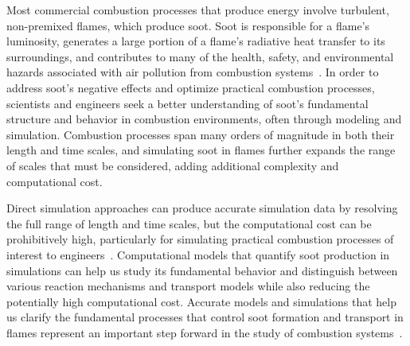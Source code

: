 \documentclass[preprint,letterpaper]{elsarticle}
\begin{document}
Most commercial combustion processes that produce energy involve turbulent, non-premixed flames, which produce soot. Soot is responsible for a flame's luminosity, generates a large portion of a flame's radiative heat transfer to its surroundings, and contributes to many of the health, safety, and environmental hazards associated with air pollution from combustion systems~\cite{EPA_2009,EPA_2004}. In order to address soot's negative effects and optimize practical combustion processes, scientists and engineers seek a better understanding of soot's fundamental structure and behavior in combustion environments, often through modeling and simulation.
Combustion processes span many orders of magnitude in both their length and time scales, and simulating soot in flames further expands the range of scales that must be considered, adding additional complexity and computational cost.

Direct simulation approaches can produce accurate simulation data by resolving the full range of length and time scales, but the computational cost can be prohibitively high, particularly for simulating practical combustion processes of interest to engineers~\cite{Pope_2000}.
Computational models that quantify soot production in simulations can help us study its fundamental behavior and distinguish between various reaction mechanisms and transport models while also reducing the potentially high computational cost.
Accurate models and simulations that help us clarify the fundamental processes that control soot formation and transport in flames represent an important step forward in the study of combustion systems~\cite{Frenklach_2002b}.
\end{document}

